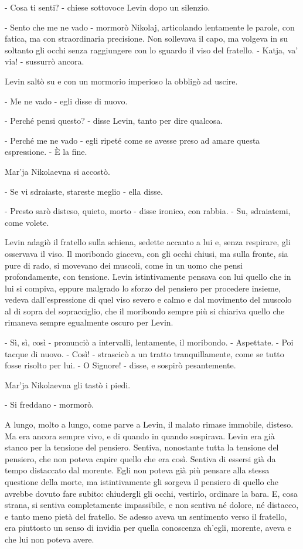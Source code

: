 - Cosa ti senti? - chiese sottovoce Levin dopo un silenzio. 

- Sento che me ne vado - mormorò Nikolaj, articolando lentamente le parole, con fatica, ma con straordinaria precisione. Non sollevava il capo, ma volgeva in su soltanto gli occhi senza raggiungere con lo sguardo il viso del fratello. - Katja, va' via! - sussurrò ancora. 

Levin saltò su e con un mormorio imperioso la obbligò ad uscire. 

- Me ne vado - egli disse di nuovo. 

- Perché pensi questo? - disse Levin, tanto per dire qualcosa. 

- Perché me ne vado - egli ripeté come se avesse preso ad amare questa espressione. - È la fine. 

Mar'ja Nikolaevna si accostò. 

- Se vi sdraiaste, stareste meglio - ella disse. 

- Presto sarò disteso, quieto, morto - disse ironico, con rabbia. - Su, sdraiatemi, come volete. 

Levin adagiò il fratello sulla schiena, sedette accanto a lui e, senza respirare, gli osservava il viso. Il moribondo giaceva, con gli occhi chiusi, ma sulla fronte, sia pure di rado, si movevano dei muscoli, come in un uomo che pensi profondamente, con tensione. Levin istintivamente pensava con lui quello che in lui si compiva, eppure malgrado lo sforzo del pensiero per procedere insieme, vedeva dall'espressione di quel viso severo e calmo e dal movimento del muscolo al di sopra del sopracciglio, che il moribondo sempre più si chiariva quello che rimaneva sempre egualmente oscuro per Levin. 

- Sì, sì, così - pronunciò a intervalli, lentamente, il moribondo. - Aspettate. - Poi tacque di nuovo. - Così! - strascicò a un tratto tranquillamente, come se tutto fosse risolto per lui. - O Signore! - disse, e sospirò pesantemente. 

Mar'ja Nikolaevna gli tastò i piedi. 

- Si freddano - mormorò. 

A lungo, molto a lungo, come parve a Levin, il malato rimase immobile, disteso. Ma era ancora sempre vivo, e di quando in quando sospirava. Levin era già stanco per la tensione del pensiero. Sentiva, nonostante tutta la tensione del pensiero, che non poteva capire quello che era così. Sentiva di essersi già da tempo distaccato dal morente. Egli non poteva già più pensare alla stessa questione della morte, ma istintivamente gli sorgeva il pensiero di quello che avrebbe dovuto fare subito: chiudergli gli occhi, vestirlo, ordinare la bara. E, cosa strana, si sentiva completamente impassibile, e non sentiva né dolore, né distacco, e tanto meno pietà del fratello. Se adesso aveva un sentimento verso il fratello, era piuttosto un senso di invidia per quella conoscenza ch'egli, morente, aveva e che lui non poteva avere. 


